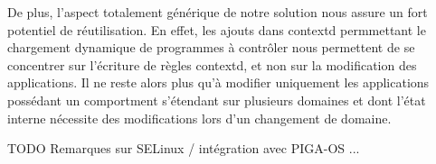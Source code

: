 \documentclass[pdftex,a4paper,titlepage,11pt]{article}
\begin{document}
De plus, l'aspect totalement générique de notre solution nous assure un fort potentiel de réutilisation. En effet, les ajouts dans contextd permmettant le chargement dynamique de programmes à contrôler nous permettent de se concentrer sur l'écriture de règles contextd, et non sur la modification des applications. Il ne reste alors plus qu'à modifier uniquement les applications possédant un comportment s'étendant sur plusieurs domaines et dont l'état interne nécessite des modifications lors d'un changement de domaine.

TODO Remarques sur SELinux / intégration avec PIGA-OS ...


\newpage
\end{document}
